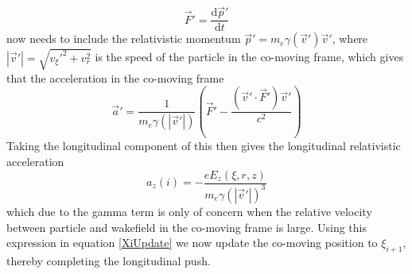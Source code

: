  \begin{equation}
 \vec{F}'=\frac{\mathrm{d}\vec{p}'}{\mathrm{d}t}
 \end{equation}
now needs to include the relativistic momentum $\vec{p}'=m_e \gamma( \vec{v}') \vec{v}'$, where $|\vec{v}'|=\sqrt{{v_{\xi}'}^2+v_r^2}$ is the speed of the particle in the co-moving frame, which gives that the acceleration in the co-moving frame
 \begin{equation}
 \vec{a}'=\frac{1}{m_e\gamma(|\vec{v}'|)}\left(\vec{F}'-\frac{(\vec{v}'\cdot\vec{F}')\vec{v}'}{c^2}\right)
 \end{equation}
 Taking the longitudinal component of this then gives the longitudinal relativistic acceleration
 \begin{equation}
 a_z(i)=-\frac{eE_z\left(\xi,r,z\right)}{m_e\gamma(|\vec{v}'|)^3}
 \end{equation}
which due to the gamma term is only of concern when the relative velocity between particle and wakefield in the co-moving frame is large. Using this expression in equation \ref{XiUpdate} we now update the co-moving position to $\xi_{i+1}$, thereby completing the longitudinal push. 

